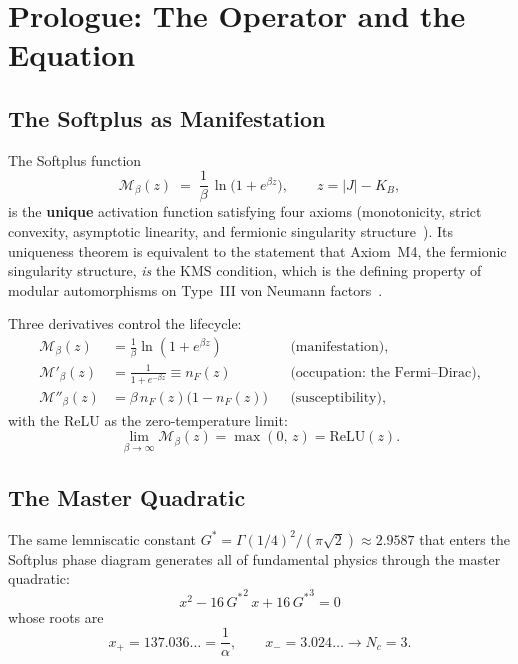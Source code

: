 \documentclass[12pt, letterpaper]{article}
\theoremstyle{plain}
\theoremstyle{definition}
\theoremstyle{remark}
\newcommand{\Mop}{\mathcal{M}}            %
\newcommand{\Gstar}{{G^{*}}}              %
\newcommand{\KB}{K_{\!B}}                 %
\newcommand{\nF}{n_{\!F}}                 %
\begin{document}
\section{Prologue: The Operator and the Equation}

\subsection{The Softplus as Manifestation}

The Softplus function
\begin{equation}\label{eq:softplus}
  \Mop_\beta(z) \;=\; \frac{1}{\beta}\,\ln\!\bigl(1 + e^{\beta z}\bigr),
  \qquad z = |J| - \KB,
\end{equation}
is the \textbf{unique} activation function satisfying four axioms (monotonicity, strict convexity, asymptotic linearity, and fermionic singularity structure~\cite{ReLU}). Its uniqueness theorem is equivalent to the statement that Axiom~M4, the fermionic singularity structure, \emph{is} the KMS condition, which is the defining property of modular automorphisms on Type~III von Neumann factors~\cite{RT}.

Three derivatives control the lifecycle:
\begin{align}
  \Mop_\beta(z)    &= \frac{1}{\beta}\ln(1 + e^{\beta z})
    && \text{(manifestation)}, \label{eq:M}\\[4pt]
  \Mop'_\beta(z)   &= \frac{1}{1 + e^{-\beta z}} \equiv \nF(z)
    && \text{(occupation: the Fermi--Dirac)}, \label{eq:Mprime}\\[4pt]
  \Mop''_\beta(z)  &= \beta\,\nF(z)\bigl(1 - \nF(z)\bigr)
    && \text{(susceptibility)}, \label{eq:Mdoubleprime}
\end{align}
with the ReLU as the zero-temperature limit:
\begin{equation}\label{eq:relu}
  \lim_{\beta \to \infty}\Mop_\beta(z) = \max(0,\, z) = \mathrm{ReLU}(z).
\end{equation}

\subsection{The Master Quadratic}

The same lemniscatic constant $\Gstar = \Gamma(1/4)^2\!/(\pi\sqrt{2}) \approx 2.9587$ that enters the Softplus phase diagram generates all of fundamental physics through the master quadratic:
\begin{equation}\label{eq:quadratic}
  \boxed{x^2 - 16\,\Gstar^{\!2}\,x + 16\,\Gstar^{\!3} = 0}
\end{equation}
whose roots are
\begin{equation}\label{eq:roots}
  x_+ = 137.036\ldots = \frac{1}{\alpha},
  \qquad
  x_- = 3.024\ldots \to N_c = 3.
\end{equation}
\end{document}
